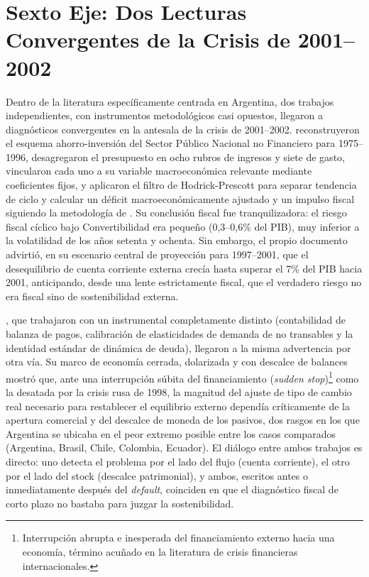\section{Sexto Eje: Dos Lecturas Convergentes de la Crisis de 2001--2002}

Dentro de la literatura específicamente centrada en Argentina, dos trabajos independientes, con instrumentos metodológicos casi opuestos, llegaron a diagnósticos convergentes en la antesala de la crisis de 2001--2002. \citet{cetrangolo1997} reconstruyeron el esquema ahorro-inversión del Sector Público Nacional no Financiero para 1975--1996, desagregaron el presupuesto en ocho rubros de ingresos y siete de gasto, vincularon cada uno a su variable macroeconómica relevante mediante coeficientes fijos, y aplicaron el filtro de Hodrick-Prescott para separar tendencia de ciclo y calcular un déficit macroeconómicamente ajustado y un impulso fiscal siguiendo la metodología de \citet{blanchard1990}. Su conclusión fiscal fue tranquilizadora: el riesgo fiscal cíclico bajo Convertibilidad era pequeño (0,3--0,6\% del PIB), muy inferior a la volatilidad de los años setenta y ochenta. Sin embargo, el propio documento advirtió, en su escenario central de proyección para 1997--2001, que el desequilibrio de cuenta corriente externa crecía hasta superar el 7\% del PIB hacia 2001, anticipando, desde una lente estrictamente fiscal, que el verdadero riesgo no era fiscal sino de sostenibilidad externa.

\citet{calvo2003}, que trabajaron con un instrumental completamente distinto (contabilidad de balanza de pagos, calibración de elasticidades de demanda de no transables y la identidad estándar de dinámica de deuda), llegaron a la misma advertencia por otra vía. Su marco de economía cerrada, dolarizada y con descalce de balances mostró que, ante una interrupción súbita del financiamiento (\textit{sudden stop})\footnote{Interrupción abrupta e inesperada del financiamiento externo hacia una economía, término acuñado en la literatura de crisis financieras internacionales.} como la desatada por la crisis rusa de 1998, la magnitud del ajuste de tipo de cambio real necesario para restablecer el equilibrio externo dependía críticamente de la apertura comercial y del descalce de moneda de los pasivos, dos rasgos en los que Argentina se ubicaba en el peor extremo posible entre los casos comparados (Argentina, Brasil, Chile, Colombia, Ecuador). El diálogo entre ambos trabajos es directo: uno detecta el problema por el lado del flujo (cuenta corriente), el otro por el lado del stock (descalce patrimonial), y ambos, escritos antes o inmediatamente después del \textit{default}, coinciden en que el diagnóstico fiscal de corto plazo no bastaba para juzgar la sostenibilidad.

